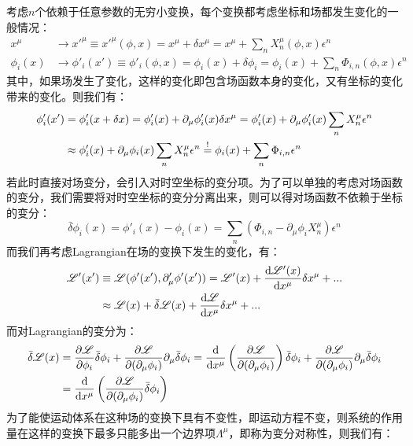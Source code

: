 考虑$n$个依赖于任意参数的无穷小变换，每个变换都考虑坐标和场都发生变化的一般情况：
\begin{align}
	x^\mu&\rightarrow x'^\mu\equiv x'^\mu(\phi,x)=x^\mu+\delta x^\mu=x^\mu+\sum_{n}X^\mu_n(\phi,x)\epsilon^n\label{eqdx}\\
	\phi_{i}(x)&\rightarrow\phi'_i(x')\equiv \phi'_i(\phi,x)=\phi_{i}(x)+\delta\phi_{i}=\phi_{i}(x)+\sum_{n}\Phi_{i,n}(\phi,x)\epsilon^n
\end{align}
其中，如果场发生了变化，这样的变化即包含场函数本身的变化，又有坐标的变化带来的变化。则我们有：
\begin{align}
	\phi'_i(x')&=\phi'_i(x+\delta x)=\phi'_i(x)+\partial_\mu\phi'_i(x)\delta x^\mu
	=\phi'_i(x)+\partial_\mu\phi'_i(x)\sum_{n}X^\mu_n\epsilon^n\notag\\
	&\approx\phi'_i(x)+\partial_\mu\phi_i(x)\sum_{n}X^\mu_n\epsilon^n
	\overset{!}{=}\phi_{i}(x)+\sum_{n}\Phi_{i,n}\epsilon^n
\end{align}
若此时直接对场变分，会引入对时空坐标的变分项。为了可以单独的考虑对场函数的变分，我们需要将对时空坐标的变分分离出来，则可以得对场函数不依赖于坐标的变分：
\begin{equation}
	\bar{\delta}\phi_{i}(x)=\phi'_i(x)-\phi_{i}(x)=\sum_{n}(\Phi_{i,n}-\partial_\mu\phi_iX^\mu_n)\epsilon^n
	\label{eqdf}
\end{equation}
而我们再考虑Lagrangian在场的变换下发生的变化，有：
\begin{align}
	\mathscr{L}'(x')&\equiv\mathscr{L}(\phi'(x'),\partial_\mu'\phi'(x'))=\mathscr{L}'(x)+\frac{\mathrm{d}\mathscr{L}'(x)}{\mathrm{d}x^\mu}\delta x^\mu+...\notag\\
	&\approx\mathscr{L}(x)+\bar{\delta}\mathscr{L}(x)+\frac{\mathrm{d}\mathscr{L}}{\mathrm{d}x^\mu}\delta x^\mu+...
	\label{eqlp}
\end{align}
而对Lagrangian的变分为：
\begin{align}
	\bar{\delta}\mathscr{L}(x)&=\frac{\partial\mathscr{L}}{\partial\phi_{i}}\bar{\delta}\phi_i+\frac{\partial\mathscr{L}}{\partial(\partial_\mu\phi_i)}\partial_\mu\bar{\delta}\phi_i=\frac{\mathrm{d}}{\mathrm{d}x^\mu}\left( \frac{\partial\mathscr{L}}{\partial(\partial_\mu\phi_i)}\right) \bar{\delta}\phi_i+\frac{\partial\mathscr{L}}{\partial(\partial_\mu\phi_i)}\partial_\mu\bar{\delta}\phi_i\notag\\
	&=\frac{\mathrm{d}}{\mathrm{d}x^\mu}\left( \frac{\partial\mathscr{L}}{\partial(\partial_\mu\phi_i)}\bar{\delta}\phi_i\right) 
	\label{eqdl}
\end{align}
为了能使运动体系在这种场的变换下具有不变性，即运动方程不变，则系统的作用量在这样的变换下最多只能多出一个边界项$\Lambda^\mu$，即称为变分对称性，则我们有：
